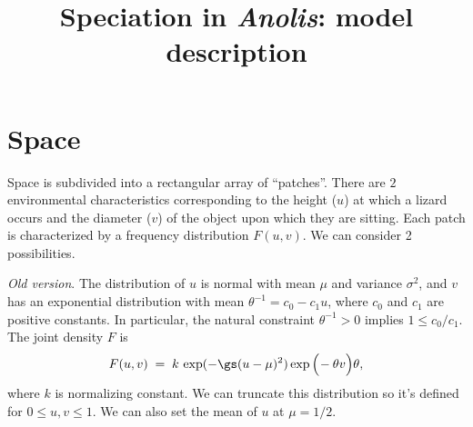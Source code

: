 \documentclass{article}
\begin{document}




\renewcommand{\baselinestretch}{1}
\normalsize




\title{Speciation in {\em Anolis}: model description}

\maketitle


\section{Space}

Space is subdivided into a rectangular array of ``patches''. There are
$2$ environmental characteristics corresponding to the height ($u$) at
which a lizard occurs and the diameter ($v$) of the object upon which
they are sitting. Each patch is characterized by a frequency
distribution $F(u,v)$. We can consider 2 possibilities.

{\em Old version}.\quad
The distribution of $u$ is normal with mean $\mu$ and variance $\sigma^2$, 
and $v$ has an exponential distribution with mean
$\theta^{-1} = c_0 - c_1 u$, where $c_0$ and $c_1$ are positive
constants.  In particular, the natural constraint $\theta^{-1} > 0$
implies $1 \le c_0/c_1$.  The joint density $F$ is
\begin{equation} \label{gaus}
F(u,v) \; = \;
k \,\exp (- \gs (u - \mu)^2 )\exp\Big(\!- \theta  v \Big) \theta,
\end{equation}
where $k$ is normalizing constant.
We can truncate this distribution so it's defined for $0\leq u,v \leq 1$.
We can also set the mean of $u$ at $\mu=1/2$.
\end{document}

